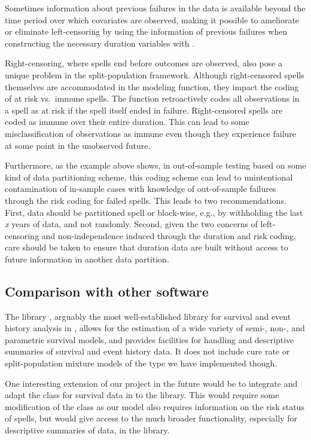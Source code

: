 \documentclass[article]{jss}
\begin{document}
Sometimes information about previous failures in the data is available
beyond the time period over which covariates are observed, making it
possible to ameliorate or eliminate left-censoring by using the
information of previous failures when constructing the necessary
duration variables with .

Right-censoring, where spells end before outcomes are observed, also
pose a unique problem in the split-population framework. Although
right-censored spells themselves are accommodated in the modeling
function, they impact the coding of at risk vs.~immune spells. The
 function retroactively codes all observations in
a spell as at risk if the spell itself ended in failure. Right-censored
spells are coded as immune over their entire duration. This can lead to
some misclassification of observations as immune even though they
experience failure at some point in the unobserved future.

Furthermore, as the example above shows, in out-of-sample testing based
on some kind of data partitioning scheme, this coding scheme can lead to
unintentional contamination of in-sample cases with knowledge of
out-of-sample failures through the risk coding for failed spells. This
leads to two recommendations. First, data should be partitioned spell or
block-wise, e.g., by withholding the last \emph{x} years of data, and
not randomly. Second, given the two concerns of left-censoring and
non-independence induced through the duration and risk coding, care
should be taken to ensure that duration data are built without access to
future information in another data partition.

\subsection{Comparison with other software}

The  library \citep{thernau2000modeling, thernau2015survival}, arguably the most well-established library for survival and event history analysis in , allows for the estimation of a wide variety of semi-, non-, and parametric survival models, and provides facilities for handling and descriptive summaries of survival and event history data. It does not include cure rate or split-population mixture models of the type we have implemented though.

One interesting extension of our project in the future would be to integrate and adapt the  class for survival data in  to the  library. This would require some modification of the class as our model also requires information on the risk status of spells, but would give access to the much broader functionality, especially for descriptive summaries of data, in the  library. 
\end{document}
